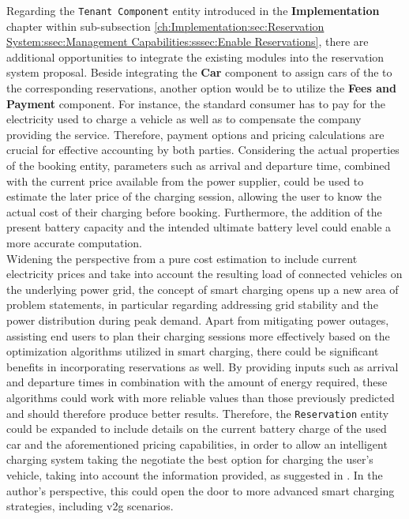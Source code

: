 Regarding the \texttt{Tenant Component} entity introduced in the \textbf{Implementation} chapter within sub-subsection \ref{ch:Implementation:sec:Reservation System:ssec:Management Capabilities:sssec:Enable Reservations}, there are additional opportunities to integrate the existing modules into the reservation system proposal. 
Beside integrating the \textbf{Car} component to assign cars of the  to the corresponding reservations, another option would be to utilize the \textbf{Fees and Payment} component.
For instance, the standard consumer has to pay for the electricity used to charge a vehicle as well as to compensate the company providing the service. Therefore, payment options and pricing calculations are crucial for effective accounting by both parties. 
Considering the actual properties of the booking entity, parameters such as arrival and departure time, combined with the current price available from the power supplier, could be used to estimate the later price of the charging session, allowing the user to know the actual cost of their charging before booking.
Furthermore, the addition of the present battery capacity and the intended ultimate battery level could enable a more accurate computation. \\
Widening the perspective from a pure cost estimation to include current electricity prices and take into account the resulting load of connected vehicles on the underlying power grid, the concept of smart charging opens up a new area of problem statements, in particular regarding addressing grid stability and the power distribution during peak demand.
Apart from mitigating power outages, assisting end users to plan their charging sessions more effectively based on the optimization algorithms utilized in smart charging, there could be significant benefits in incorporating reservations as well.
By providing inputs such as arrival and departure times in combination with the amount of energy required, these algorithms could work with more reliable values than those previously predicted and should therefore produce better results.
Therefore, the \texttt{Reservation} entity could be expanded to include details on the current battery charge of the used car and the aforementioned pricing capabilities, in order to allow an intelligent charging system taking the negotiate the best option for charging the user's vehicle, taking into account the information provided, as suggested in \cite{orcioni_ev_2020}.
In the author's perspective, this could open the door to more advanced smart charging strategies, including \acrshort{v2g} scenarios. \\

